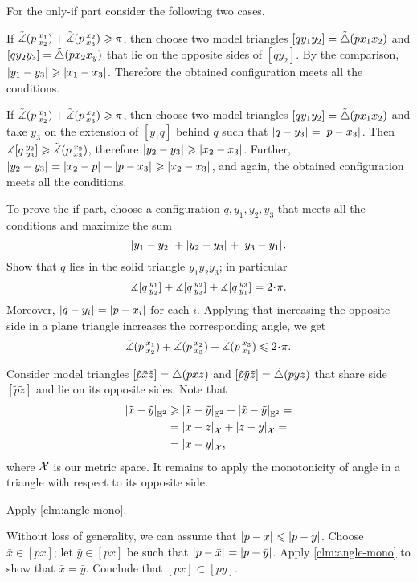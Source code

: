  For the only-if part consider the following two cases.

If $\tilde\measuredangle(p\,{}^{x_1}_{x_2})+\tilde\measuredangle(p\,{}^{x_2}_{x_3})\geqslant \pi$, then choose two model triangles $[qy_1y_2]=\tilde\triangle(px_1x_2)$ and $[qy_2y_3]=\tilde\triangle(px_2x_y)$ that lie on the opposite sides of $[qy_2]$.
By the comparison, $|{y_1}-{y_3}|_{}^{{}}\geqslant |{x_1}-{x_3}|_{}^{{}}$.
Therefore the obtained configuration meets all the conditions.

If $\tilde\measuredangle(p\,{}^{x_1}_{x_2})+\tilde\measuredangle(p\,{}^{x_2}_{x_3})\geqslant \pi$, then choose two model triangles $[qy_1y_2]=\tilde\triangle(px_1x_2)$
and take $y_3$ on the extension of $[y_1q]$ behind $q$ such that $|{q}-{y_3}|_{}^{{}}=|{p}-{x_3}|_{}^{{}}$.
Then $\measuredangle [q\,{}^{y_2}_{y_3}]\geqslant \tilde\measuredangle(p\,{}^{x_2}_{x_3})$, therefore $|{y_2}-{y_3}|_{}^{{}}\geqslant |{x_2}-{x_3}|_{}^{{}}$.
Further, $|{y_2}-{y_3}|_{}^{{}}=|{x_2}-{p}|_{}^{{}}+|{p}-{x_3}|_{}^{{}} \geqslant |{x_2}-{x_3}|_{}^{{}}$,
and again, the obtained configuration meets all the conditions.

To prove the if part, choose a configuration $q,y_1,y_2,y_3$ that meets all the conditions and maximize the sum
\[|{y_1}-{y_2}|_{}^{{}}+|{y_2}-{y_3}|_{}^{{}}+|{y_3}-{y_1}|_{}^{{}}.\]
Show that $q$ lies in the solid triangle $y_1y_2y_3$;
in particular 
\[\mangle \hinge q{y_1}{y_2}+\mangle \hinge q{y_2}{y_3}+ \mangle \hinge q{y_3}{y_1}=2\cdot\pi.\]
Moreover, $|{q}-{y_i}|_{}^{{}}=|{p}-{x_i}|_{}^{{}}$ for each $i$.
Applying that increasing the opposite side in a plane triangle increases the corresponding angle, we get 
\[\angk  p{x_1}{x_2}+\angk p{x_2}{x_3}+\angk p{x_3}{x_1}
\le 
2\cdot\pi.
\]

Consider model triangles $[\tilde p\tilde x\tilde z]=\tilde\triangle(pxz)$ and $[\tilde p\tilde y\tilde z]=\tilde\triangle(pyz)$
that share side $[\tilde p\tilde z]$ and lie on its opposite sides.
Note that 
\begin{align*}
|{\tilde x}-{\tilde y}|_{\mathbb{E}^2}^{{}}
&\geqslant |{\tilde x}-{\tilde y}|_{\mathbb{E}^2}^{{}}+|{\tilde x}-{\tilde y}|_{\mathbb{E}^2}^{{}}=
\\
&=|{x}-{z}|_{\mathcal{X}}^{{}}+|{z}-{y}|_{\mathcal{X}}^{{}}=
\\
&=|{x}-{y}|_{\mathcal{X}}^{{}},
\end{align*}
where $\mathcal{X}$ is our metric space.
It remains to apply the monotonicity of angle in a triangle with respect to its opposite side. 


Apply \ref{clm:angle-mono}.

Without loss of generality, we can assume that $|{p}-{x}|_{}^{{}}\leqslant |{p}-{y}|_{}^{{}}$.
Choose $\bar x\in [px]$;
let $\bar y\in [px]$ be such that $|{p}-{\bar x}|_{}^{{}}=|{p}-{\bar y}|_{}^{{}}$.
Apply \ref{clm:angle-mono} to show that $\bar x=\bar y$.
Conclude that $[px]\subset [py]$.

